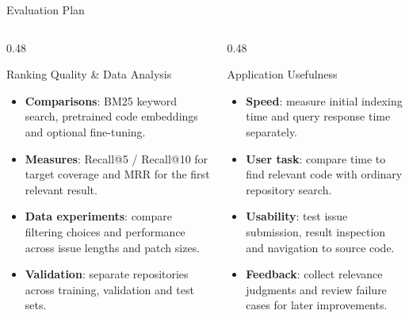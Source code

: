 \documentclass[t, aspectratio=169]{beamer}
\begin{document}
\begin{frame}{Evaluation Plan}
\small
\begin{columns}[T]
\begin{column}{0.48\textwidth}
\begin{block}{Ranking Quality \& Data Analysis}
\begin{itemize}
    \setlength{\itemsep}{5pt}
    \item \textbf{Comparisons}: BM25 keyword search, pretrained code embeddings and optional fine-tuning.
    \item \textbf{Measures}: Recall@5 / Recall@10 for target coverage and MRR for the first relevant result.
    \item \textbf{Data experiments}: compare filtering choices and performance across issue lengths and patch sizes.
    \item \textbf{Validation}: separate repositories across training, validation and test sets.
\end{itemize}
\end{block}
\end{column}
\begin{column}{0.48\textwidth}
\begin{block}{Application Usefulness}
\begin{itemize}
    \setlength{\itemsep}{5pt}
    \item \textbf{Speed}: measure initial indexing time and query response time separately.
    \item \textbf{User task}: compare time to find relevant code with ordinary repository search.
    \item \textbf{Usability}: test issue submission, result inspection and navigation to source code.
    \item \textbf{Feedback}: collect relevance judgments and review failure cases for later improvements.
\end{itemize}
\end{block}
\end{column}
\end{columns}
\end{frame}
\end{document}
